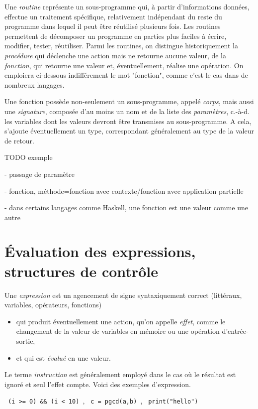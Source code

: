 \documentclass[a4paper,francais]{insalyon}
\newcommand{\cad}{c.-à-d.}
\begin{document}
Une \emph{routine} représente un sous-programme qui, à partir d'informations données, effectue un traitement spécifique, relativement indépendant du reste du programme dans lequel il peut être réutilisé plusieurs fois. Les routines permettent de décomposer un programme en parties plus faciles à écrire, modifier, tester, réutiliser. Parmi les routines, on distingue historiquement la \emph{procédure} qui déclenche une action mais ne retourne aucune valeur, de la \emph{fonction}, qui retourne une valeur et, éventuellement, réalise une opération. On emploiera ci-dessous indifférement le mot "fonction", comme c'est le cas dans de nombreux langages.    

Une fonction possède non-seulement un sous-programme, appelé \emph{corps}, mais aussi une \emph{signature}, composée d'au moins un nom et de la liste des \emph{paramètres}, {\cad} les variables dont les valeurs devront être transmises au sous-programme. A cela, s'ajoute éventuellement un type, correspondant généralement au type de la valeur de retour. 

TODO exemple

- passage de paramètre

- fonction, méthode=fonction avec contexte/fonction avec application partielle

- dans certains langages comme Haskell, une fonction est une valeur comme une autre


\section{\'Evaluation des expressions, structures de contrôle}



Une \emph{expression} est un agencement de signe syntaxiquement correct (littéraux, variables, opérateurs, fonctions)
\begin{itemize}
\item qui produit éventuellement une action, qu'on appelle \emph{effet}, comme le changement de la valeur de variables en mémoire ou une opération d'entrée-sortie, 
\item et qui est \emph{évalué} en une valeur. 
\end{itemize}
Le terme \emph{instruction} est généralement employé dans le cas où le résultat est ignoré et seul l'effet compte.
Voici des exemples d'expression. 

\verb! (i >= 0) && (i < 10) !, \verb! c = pgcd(a,b) !, \verb! print("hello") !
\end{document}
